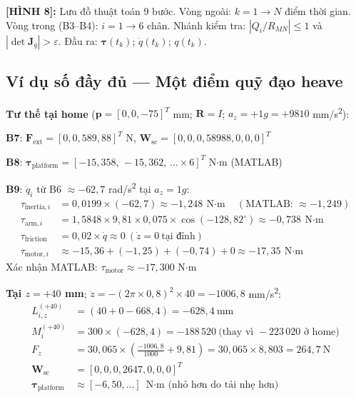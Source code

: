 \documentclass[12pt,a4paper]{article}
\newcommand{\figref}[2]{%
  \begin{mdframed}[
    linecolor=blue!50, linewidth=1pt,
    backgroundcolor=blue!3,
    innerleftmargin=6pt, innerrightmargin=6pt,
    innertopmargin=4pt, innerbottommargin=4pt
  ]
  {\small\bfseries [H\`{I}NH #1]:} {\small #2}
  \end{mdframed}
}
\newcommand{\R}{\mathbf{R}}
\newcommand{\pp}{\mathbf{p}}
\newcommand{\Jq}{\mathbf{J}_q}
\newcommand{\tauv}{\boldsymbol{\tau}}
\newcommand{\Wsc}{\mathbf{W}_{\mathrm{sc}}}
\newcommand{\Fv}{\mathbf{F}}
\begin{document}
\figref{8}{Lưu đồ thuật toán 9 bước. Vòng ngoài: $k=1\to N$ điểm thời gian.
Vòng trong (B3--B4): $i=1\to 6$ chân. Nhánh kiểm tra: $|Q_i/R_{MN}|\leq 1$
và $|\det\Jq|>\varepsilon$. Đầu ra: $\tauv(t_k)$; $\dot q(t_k)$; $q(t_k)$.}

\subsection{Ví dụ số đầy đủ --- Một điểm quỹ đạo heave}

\begin{numbox}[frametitle={Quỹ đạo heave sin 40 mm / 0{,}8 Hz --- Phân tích từng bước}]
\textbf{Tư thế tại home} ($\pp=[0{,}0{,}-75]^T$ mm; $\R=I$; $a_z=+1g=+9810$ mm/s\textsuperscript{2}):

\textbf{B7}: $\Fv_{\text{ext}} = [0{,}0{,}589{,}88]^T$ N,
$\Wsc = [0{,}0{,}0{,}58988{,}0{,}0{,}0]^T$

\textbf{B8}: $\tauv_{\text{platform}} = [-15{,}358{,}\,-15{,}362{,}\,...\times6]^T$ N$\cdot$m (MATLAB)

\textbf{B9}: $\ddot q_i$ từ B6 $\approx -62{,}7$ rad/s\textsuperscript{2} tại $a_z=1g$:
\begin{align*}
  \tau_{\text{inertia},i} &= 0{,}0199 \times (-62{,}7) \approx -1{,}248\ \text{N$\cdot$m} \quad(\text{MATLAB: }\approx-1{,}249)\\
  \tau_{\text{arm},i}     &= 1{,}5848\times9{,}81\times0{,}075\times\cos(-128{,}82^{\circ})\approx-0{,}738\ \text{N$\cdot$m}\\
  \tau_{\text{friction}}  &= 0{,}02\times\dot q \approx 0\ (\dot z=0\ \text{tại đỉnh})\\
  \tau_{\text{motor},i}   &\approx -15{,}36 + (-1{,}25) + (-0{,}74) + 0 \approx -17{,}35\ \text{N$\cdot$m}
\end{align*}
Xác nhận MATLAB: $\tau_{\text{motor}} \approx -17{,}300$ N$\cdot$m \checkmark{}

\bigskip
\textbf{Tại $z=+40$ mm}; $\ddot z=-(2\pi\times0{,}8)^2\times40=-1006{,}8$ mm/s\textsuperscript{2}:
\begin{align*}
  L_{i,z}^{(+40)} &= (40+0-668{,}4) = -628{,}4\ \text{mm}\\
  M_i^{(+40)} &= 300\times(-628{,}4) = -188\,520\ \text{(thay vì }-223\,020\text{ ở home)}\\
  F_z &= 30{,}065\times\!\left(\tfrac{-1006{,}8}{1000}+9{,}81\right) = 30{,}065\times8{,}803 = 264{,}7\ \text{N}\\
  \Wsc &= [0{,}0{,}0{,}2647{,}0{,}0{,}0]^T\\
  \tauv_{\text{platform}} &\approx [-6{,}50{,}...] \text{ N$\cdot$m (nhỏ hơn do tải nhẹ hơn)}
\end{align*}
\end{numbox}
\end{document}
